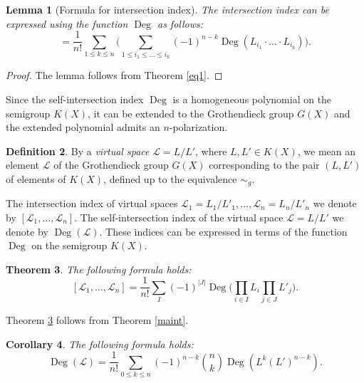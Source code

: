 \documentclass[11pt]{article}
\theoremstyle{plain}
\newtheorem{theorem}{Theorem}[section]
\newtheorem{lemma}[theorem]{Lemma}
\newtheorem{corollary}[theorem]{Corollary}
\theoremstyle{definition}
\newtheorem{definition}[theorem]{Definition}
\newcommand\D{\operatorname{Deg}}
\begin{document}
\begin{lemma}[Formula for intersection index]\label{formula} The intersection index can be expressed using the function $\D$ as follows:
\begin{equation*}
[L_1,\dots, L_n]=\frac{1}{n!} \sum _{1\leq k\leq n} \Bigg( \sum _{1\leq i_1\leq \dots \leq  i_k} (-1)^{n-k} \D(L_{i_1}\cdot \ldots\cdot L_{i_k})\Bigg).\end{equation*}
\end{lemma}

\begin{proof} The lemma follows from Theorem \ref{eq1}.
\end{proof}


Since the self-intersection index $\D$ is a homogeneous polynomial on the semigroup $K(X)$, it can be extended to the Grothendieck group $G(X)$ and the extended polynomial admits an $n$-polarization.

\begin{definition} By a {\it virtual space} $\mathcal L=L/L'$, where $L, L'\in K(X)$, we mean an element  $\mathcal L$ of the Grothendieck group $G(X)$ corresponding to the pair $(L,L')$ of elements of $K(X)$, defined up to the equivalence $\sim_g$.
\end{definition}

The intersection index of virtual spaces $\mathcal L_1= L_1/L'_1,\dots, \mathcal L_n= L_n/L'_n$ we denote by $[\mathcal L_1,\dots, \mathcal L_n] $.
 The self-intersection index of the virtual space $\mathcal L=L/L'$ we denote by $\D(\mathcal L)$.  These indices  can be expressed in terms of the function $\D$ on the semigroup $K(X)$.

\begin{theorem}\label{onfracindex} The following formula holds:
\begin{equation}\label{fracindex}
   [ \mathcal L_1,\dots, \mathcal L_n] =\frac{1}{n!} \sum_{I} (-1)^{|J|} \D\bigg(\prod_{i\in I } L_i \prod _{j\in J} L'_j\bigg).
\end{equation}
\end{theorem}

Theorem \ref{onfracindex} follows from Theorem \ref{maint}.


\begin{corollary}\label{onGD} The following formula holds:
\begin{equation}\label{GD}
\D(\mathcal L)=\frac{1}{n!} \sum_{0\leq k\leq n} (-1)^{n-k}{n\choose k}\D(L^k (L')^{n-k}).
\end{equation}
\end{corollary}
\end{document}
